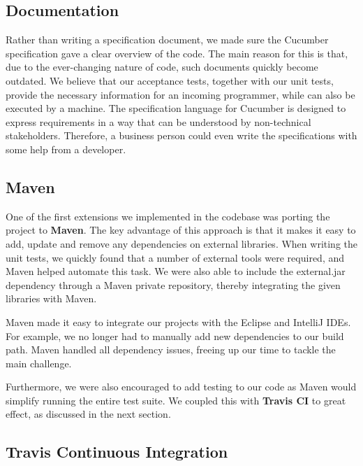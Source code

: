 \documentclass[a4paper]{article}
\begin{document}
\subsection{Documentation}

Rather than writing a specification document, we made sure the Cucumber specification gave a clear overview of the code. The main reason for this is that, due to the ever-changing nature of code, such documents quickly become outdated. We believe that our acceptance tests, together with our unit tests, provide the necessary information for an incoming programmer, while can also be executed by a machine. The specification language for Cucumber is designed to express requirements in a way that can be understood by non-technical stakeholders. Therefore, a business person could even write the specifications with some help from a developer. 


\subsection{Maven}

One of the first extensions we implemented in the codebase was porting the project to {\bf Maven}. The key advantage of this approach is that it makes it easy to add, update and remove any dependencies on external libraries. When writing the unit tests, we quickly found that a number of external tools were required, and Maven helped automate this task. We were also able to include the external.jar dependency through a Maven private repository, thereby integrating the given libraries with Maven.

Maven made it easy to integrate our projects with the Eclipse and IntelliJ IDEs. For example, we no longer had to manually add new dependencies to our build path. Maven handled all dependency issues, freeing up our time to tackle the main challenge.

Furthermore, we were also encouraged to add testing to our code as Maven would simplify running the entire test suite. We coupled this with {\bf Travis CI} to great effect, as discussed in the next section.

\subsection{Travis Continuous Integration}
\end{document}
